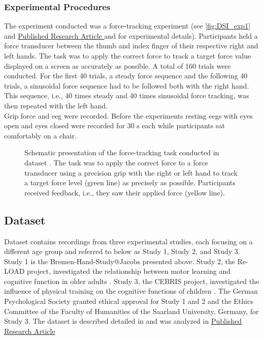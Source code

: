 \subsubsection{Experimental Procedures}
\label{methods:datasets:I:experiment}
The experiment conducted was a force-tracking experiment (see \autoref{fig:DSI_exp1} and \hyperref[pub:paperI]{Published Research Article } and \hyperref[pub:paperI]{} for experimental details). Participants held a force transducer between the thumb and index finger of their respective right and left hands. The task was to apply the correct force to track a target force value displayed on a screen as accurately as possible. A total of 160 trials were conducted. For the first 40 trials, a steady force sequence and the following 40 trials, a sinusoidal force sequence had to be followed both with the right hand. This sequence, i.e., 40 times steady and 40 times sinusoidal force tracking, was then repeated with the left hand.\\
Grip force and \gls{eeg} were recorded. Before the experiments resting \glspl{eeg} with eyes open and eyes closed were recorded for 30 s each while participants sat comfortably on a chair.

\begin{figure}[h]
\begin{center}

\caption[Schematic presentation of the force-tracking task conducted in dataset .]{Schematic presentation of the force-tracking task conducted in dataset . The task was to apply the correct force to a force transducer using a precision grip with the right or left hand to track a target force level (green line) as precisely as possible. Participants received feedback, i.e., they saw their applied force (yellow line).}
\label{fig:DSI_exp1}
\end{center}
\end{figure}

\subsection{Dataset }
\label{methods:datasets:II}
Dataset  contains recordings from three experimental studies, each focusing on a different age group and referred to below as Study 1, Study 2, and Study 3.\\
Study 1 is the Bremen-Hand-Study@Jacobs presented above. Study 2, the Re-LOAD project, investigated the relationship between motor learning and cognitive function in older adults \cite{HUBNER2018104, Hübner2018}. Study 3, the CEBRIS project, investigated the influence of physical training on the cognitive functions of children \cite{Koutsandreou2016}. The German Psychological Society granted ethical approval for Study 1 and 2 and the Ethics Committee of the Faculty of Humanities of the Saarland University, Germany, for Study 3. The dataset is described detailed in \cite{Reuter2019} and was analyzed in \hyperref[pub:paperII]{Published Research Article }

